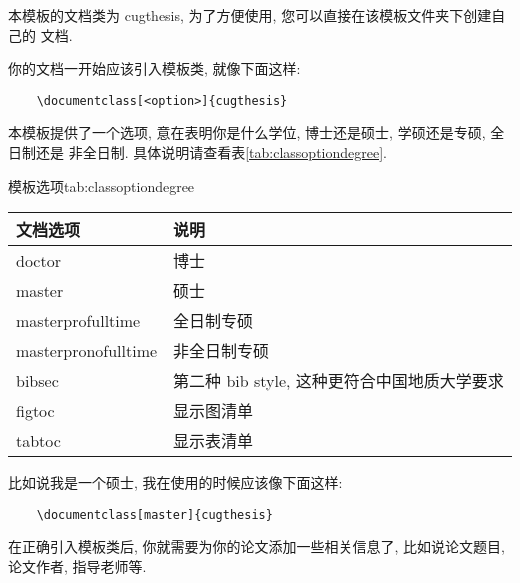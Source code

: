 \documentclass[bibsec, master, figtoc, tabtoc]{cugthesis}
\begin{document}
本模板的文档类为 cugthesis, 为了方便使用, 您可以直接在该模板文件夹下创建自己的
文档.

你的文档一开始应该引入模板类, 就像下面这样:
\begin{verbatim}
    \documentclass[<option>]{cugthesis}
\end{verbatim}

本模板提供了一个选项, 意在表明你是什么学位, 博士还是硕士, 学硕还是专硕, 全日制还是
非全日制. 具体说明请查看表\ref{tab:classoptiondegree}.

\begin{ttab}{模板选项}{tab:classoptiondegree}
    \begin{tabular}{ll}
        \toprule
        文档选项            & 说明                                         \\
        \midrule
        doctor              & 博士                                         \\
        master              & 硕士                                         \\
        masterprofulltime   & 全日制专硕                                   \\
        masterpronofulltime & 非全日制专硕                                 \\
        bibsec              & 第二种 bib style, 这种更符合中国地质大学要求 \\
        figtoc              & 显示图清单                                   \\
        tabtoc              & 显示表清单                                   \\
        \bottomrule
    \end{tabular}
\end{ttab}

比如说我是一个硕士, 我在使用的时候应该像下面这样:
\begin{verbatim}
    \documentclass[master]{cugthesis}
\end{verbatim}

在正确引入模板类后, 你就需要为你的论文添加一些相关信息了, 比如说论文题目, 论文作者,
指导老师等.
\end{document}
